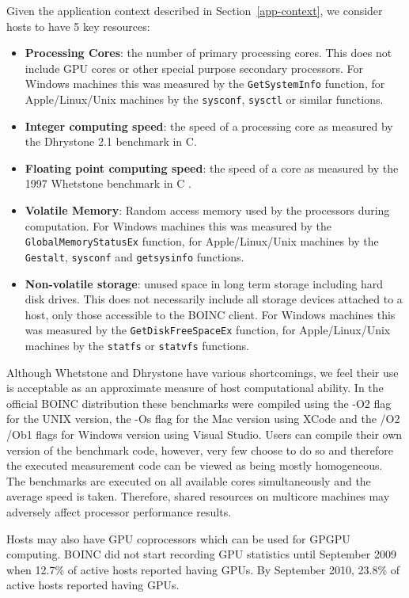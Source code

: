 \documentclass[conference]{IEEEtran}
\begin{document}
Given the application context described in
Section~\ref{app-context}, we consider hosts to have 5 key
resources:

\begin{itemize}
\item{\textbf{Processing Cores}: the number of primary processing cores.  This does not include GPU cores or other special purpose secondary processors.  For Windows machines this was measured by the {\tt GetSystemInfo} function, for Apple/Linux/Unix machines by the {\tt sysconf}, {\tt sysctl} or similar functions.}
\item{\textbf{Integer computing speed}: the speed of a processing core as measured by the Dhrystone \cite{Weicker:1984p7562} 2.1 benchmark in C.}
\item{\textbf{Floating point computing speed}: the speed of a core as measured by the 1997 Whetstone benchmark in C \cite{Curnow76asynthetic}.}
\item{\textbf{Volatile Memory}: Random access memory used by the processors during computation.  For Windows machines this was measured by the {\tt GlobalMemoryStatusEx} function, for Apple/Linux/Unix machines by the {\tt Gestalt}, {\tt sysconf} and {\tt getsysinfo} functions.}
\item{\textbf{Non-volatile storage}: unused space in long term storage including hard disk drives.  This does not necessarily include all storage devices attached to a host, only those accessible to the BOINC client.  For Windows machines this was measured by the {\tt GetDiskFreeSpaceEx} function, for Apple/Linux/Unix machines by the {\tt statfs} or {\tt statvfs} functions.}
\end{itemize}

Although Whetstone and Dhrystone have various shortcomings, we feel their use is acceptable as an approximate measure of host computational ability.  In the official BOINC distribution these benchmarks were compiled using the -O2 flag for the UNIX version, the -Os flag for the Mac version using XCode and the /O2 /Ob1 flags for Windows version using Visual Studio.  Users can compile their own version of the benchmark code, however, very few choose to do so and therefore the executed measurement code can be viewed as being mostly homogeneous.  The benchmarks are executed on all available cores simultaneously and the average speed is taken.  Therefore, shared resources on multicore machines may adversely affect processor performance results.

Hosts may also have GPU coprocessors which can be used for GPGPU computing.  BOINC did not start recording GPU statistics until September 2009 when 12.7\% of active hosts reported having GPUs.  By September 2010, 23.8\% of active hosts reported having GPUs.
\end{document}
